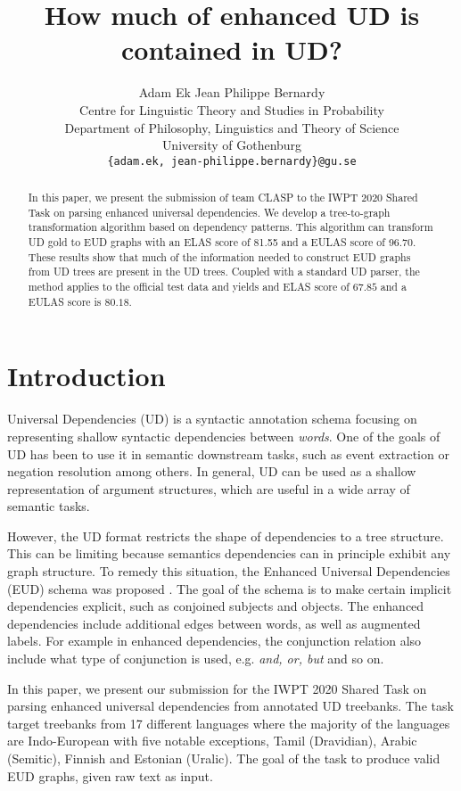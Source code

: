 \documentclass[11pt,a4paper]{article}
\title{How much of enhanced UD is contained in UD?}
\author{Adam Ek \qquad Jean Philippe Bernardy\\
    Centre for Linguistic Theory and Studies in Probability \\
    Department of Philosophy, Linguistics and Theory of Science \\
    University of Gothenburg \\
    \texttt{\{adam.ek, jean-philippe.bernardy\}@gu.se} \\}
\date{}
\begin{document}
\maketitle
    
\begin{abstract}
  In this paper, we present the submission of team CLASP to the IWPT 2020
  Shared Task on parsing enhanced universal dependencies. We develop a
  tree-to-graph transformation algorithm based on dependency
  patterns. This algorithm can transform UD gold to EUD graphs with an
  ELAS score of 81.55 and a EULAS score of 96.70.  These results show
  that much of the information needed to construct EUD graphs from UD
  trees are present in the UD trees.
  Coupled with a standard UD parser, the method applies to the
  official test data and yields and ELAS score of $67.85$ and a EULAS
  score is $80.18$.
\end{abstract}

\section{Introduction}
Universal Dependencies (UD) is a syntactic annotation schema
focusing on representing shallow syntactic dependencies between
\emph{words}. One of the goals of UD has been to use it in
semantic downstream tasks, such as event extraction
\citep{fares20182018, mcclosky2011event} or negation resolution
\citep{fares20182018} among others. In general, UD can be used as
a shallow representation of argument structures, which are useful
in a wide array of semantic tasks.

However, the UD format restricts the shape of dependencies to a tree
structure.  This can be limiting because semantics dependencies can
in principle exhibit any graph structure.
To remedy this situation, the Enhanced Universal Dependencies
(EUD) schema was proposed \citep{schuster2016enhanced}. The goal
of the schema is to make certain implicit dependencies explicit,
such as conjoined subjects and objects. The enhanced dependencies
include additional edges between words, as well as augmented
labels. For example in enhanced dependencies, the conjunction
relation also include what type of conjunction is used, e.g.
\textit{and, or, but} and so on.

In this paper, we present our submission for the IWPT 2020 Shared
Task on parsing enhanced universal dependencies from annotated UD
treebanks. The task target treebanks from 17 different languages
where the majority of the languages are Indo-European with five
notable exceptions, Tamil (Dravidian), Arabic (Semitic), Finnish
and Estonian (Uralic).  The goal of the task to produce valid EUD
graphs, given raw text as input.
\end{document}
